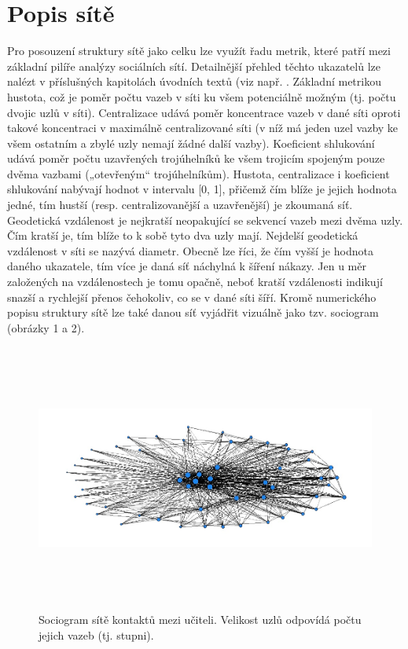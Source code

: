 \section*{Popis sítě} 

Pro posouzení struktury sítě jako celku lze využít řadu metrik, které patří mezi základní pilíře analýzy sociálních sítí. Detailnější přehled těchto ukazatelů lze nalézt v příslušných kapitolách úvodních textů (viz např. \cite{borgatti2018analyzing, prell2012social}. Základní metrikou hustota, což je poměr počtu vazeb v síti ku všem potenciálně možným (tj. počtu dvojic uzlů v síti). Centralizace udává poměr koncentrace vazeb v dané síti oproti takové koncentraci v maximálně centralizované síti (v níž má jeden uzel vazby ke všem ostatním a zbylé uzly nemají žádné další vazby). Koeficient shlukování udává poměr počtu uzavřených trojúhelníků ke všem trojicím spojeným pouze dvěma vazbami („otevřeným“ trojúhelníkům). Hustota, centralizace i koeficient shlukování nabývají hodnot v intervalu [0, 1], přičemž čím blíže je jejich hodnota jedné, tím hustší (resp. centralizovanější a uzavřenější) je zkoumaná síť. Geodetická vzdálenost je nejkratší neopakující se sekvencí vazeb mezi dvěma uzly. Čím kratší je, tím blíže to k sobě tyto dva uzly mají. Nejdelší geodetická vzdálenost v síti se nazývá diametr. Obecně lze říci, že čím vyšší je hodnota daného ukazatele, tím více je daná síť náchylná k šíření nákazy. Jen u měr založených na vzdálenostech je tomu opačně, neboť kratší vzdálenosti indikují snazší a rychlejší přenos čehokoliv, co se v dané síti šíří. Kromě numerického popisu struktury sítě lze také danou síť vyjádřit vizuálně jako tzv. sociogram (obrázky 1 a 2).

\begin{figure}[ht]
    \centering
    \includegraphics[width=320pt, height=250pt]{./pic/teachers_all_degree.jpg}
    \caption{Sociogram sítě kontaktů mezi učiteli. Velikost uzlů odpovídá počtu jejich vazeb (tj. stupni).}
    \label{fig:100-students}
\end{figure}

